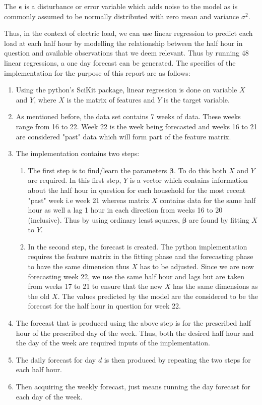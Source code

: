 \documentclass[a4paper]{article}
\begin{document}
The $\boldsymbol \epsilon$ is a disturbance or error variable which adds noise to the model as is commonly assumed to be normally distributed with zero mean and variance $\sigma^2$.

Thus, in the context of electric load, we can use linear regression to predict each load at each half hour by modelling the relationship between the half hour in question and available observations that we deem relevant. Thus by running 48 linear regressions, a one day forecast can be generated. The specifics of the implementation for the purpose of this report are as follows:
\begin{enumerate}
\item Using the python's SciKit package, linear regression is done on variable $X$ and $Y$, where $X$ is the matrix of features and $Y$ is the target variable.
\item As mentioned before, the data set contains 7 weeks of data. These weeks range from 16 to 22. Week 22 is the week being forecasted and weeks 16 to 21 are considered "past" data which will form part of the feature matrix. 
\item The implementation contains two steps: \begin{enumerate} \item The first step is to find/learn the parameters $\boldsymbol \beta$. To do this both $X$ and $Y$ are required. In this first step, $Y$ is a vector which contains information about the half hour in question for each household for the most recent "past" week i.e week 21 whereas matrix $X$ contains data for the same half hour as well a lag 1 hour in each direction from weeks 16 to 20 (inclusive). Thus by using ordinary least squares, $\boldsymbol \beta$ are found by fitting $X$ to $Y$.
\item In the second step, the forecast is created. The python implementation requires the feature matrix in the fitting phase and the forecasting phase to have the same dimension thus $X$ has to be adjusted. Since we are now forecasting week 22, we use the same half hour and lags but are taken from weeks 17 to 21 to ensure that the new $X$ has the same dimensions as the old $X$. The values predicted by the model are the considered to be the forecast for the half hour in question for week 22. \end{enumerate}
\item The forecast that is produced using the above step is for the prescribed half hour of the prescribed day of the week. Thus, both the desired half hour and the day of the week are required inputs of the implementation.
\item The daily forecast for day $d$ is then produced by repeating the two steps for each half hour.
\item Then acquiring the weekly forecast, just means running the day forecast for each day of the week.
\end{enumerate}
\end{document}

